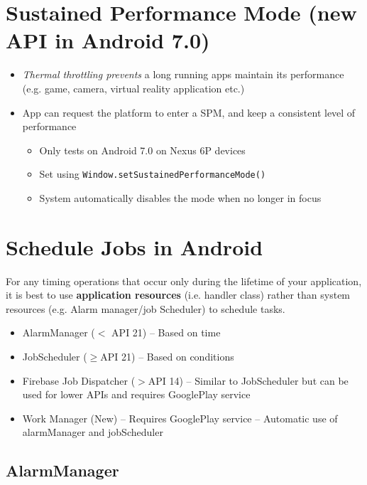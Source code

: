 \documentclass{article}
\begin{document}
\section{Sustained Performance Mode (new API in Android 7.0)}
\begin{itemize}
  \item \textit{Thermal throttling prevents} a long running apps maintain its performance (e.g. game, camera, virtual reality application etc.) 
  \item App can request the platform to enter a SPM, and keep a consistent level of performance
  \begin{itemize}
    \item Only tests on Android 7.0 on Nexus 6P devices 
    \item Set using \verb|Window.setSustainedPerformanceMode()|
    \item System automatically disables the mode when no longer in focus
  \end{itemize}
\end{itemize}

\section{Schedule Jobs in Android}

\begin{flushleft}
For any timing operations that occur only during the lifetime of your application, it is best to use \textbf{application resources} (i.e. handler class) rather than system resources (e.g. Alarm manager/job Scheduler) to schedule tasks.
\end{flushleft}
\begin{itemize}  
  \item AlarmManager ($ < $ API 21) – Based on time
  \item JobScheduler ($ \geq $API 21) – Based on conditions 
  \item Firebase Job Dispatcher ($ > $API 14) – Similar to JobScheduler but can be used for lower APIs and requires GooglePlay service 
  \item Work Manager (New) – Requires GooglePlay service – Automatic use of alarmManager and jobScheduler
\end{itemize}

\subsection{AlarmManager}
\end{document}
